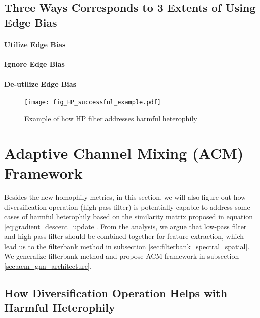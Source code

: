 \documentclass{article}
\newcommand{\0}{{\boldsymbol{0}}}
\newcommand{\6}{{\partial}}
\newcommand{\8}{{\infty}}
\newcommand{\4}{{\nabla}}
\begin{document}
\subsection{Three Ways Corresponds to 3 Extents of Using Edge Bias}

\paragraph{Utilize Edge Bias}

\paragraph{Ignore Edge Bias}

\paragraph{De-utilize Edge Bias}
\fi











\begin{figure}[htbp]
\centering
{
\captionsetup{justification = centering}
\texttt{[image: fig\_HP\_successful\_example.pdf]}}
{\caption{Example of how HP filter addresses harmful heterophily}\label{fig:successful_example_hp_filter}
}
\end{figure}
\section{Adaptive Channel Mixing (ACM) Framework}
\label{sec:acm_framework}
Besides the new homophily metrics, in this section, we will also figure out how diversification operation (high-pass filter) is potentially capable to address some cases of harmful heterophily based on the similarity matrix proposed in equation \eqref{eq:gradient_descent_update}. From the analysis, we argue that low-pass filter and high-pass filter should be combined together for feature extraction, which lead us to the filterbank method in subsection \ref{sec:filterbank_spectral_spatial}. We generalize filterbank method and propose ACM framework in subsection \ref{sec:acm_gnn_architecture}.
 
\subsection{How Diversification Operation Helps with Harmful Heterophily}
\end{document}
